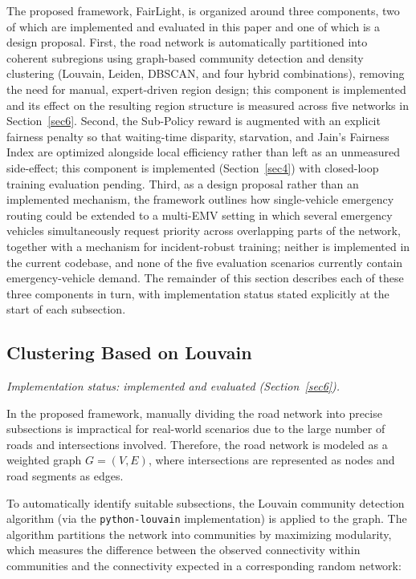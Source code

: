 \documentclass[3p,times]{elsarticle}
\theoremstyle{plain}
\theoremstyle{definition}
\begin{document}
The proposed framework, FairLight, is organized around three
components, two of which are implemented and evaluated in this paper
and one of which is a design proposal. First, the road network is
automatically partitioned into coherent subregions using graph-based
community detection and density clustering (Louvain, Leiden, DBSCAN,
and four hybrid combinations), removing the need for manual,
expert-driven region design; this component is implemented and its
effect on the resulting region structure is measured across five
networks in Section~\ref{sec6}. Second, the Sub-Policy reward is
augmented with an explicit fairness penalty so that waiting-time
disparity, starvation, and Jain's Fairness Index are optimized
alongside local efficiency rather than left as an unmeasured
side-effect; this component is implemented (Section~\ref{sec4}) with
closed-loop training evaluation pending. Third, as a design proposal
rather than an implemented mechanism, the framework outlines how
single-vehicle emergency routing could be extended to a multi-EMV
setting in which several emergency vehicles simultaneously request
priority across overlapping parts of the network, together with a
mechanism for incident-robust training; neither is implemented in the
current codebase, and none of the five evaluation scenarios currently
contain emergency-vehicle demand. The remainder of this section
describes each of these three components in turn, with implementation
status stated explicitly at the start of each subsection.


\subsection{Clustering Based on Louvain}\label{subsec3-1}

\textit{Implementation status: implemented and evaluated
(Section~\ref{sec6}).}

In the proposed framework, manually dividing the road network into
precise subsections is impractical for real-world scenarios due to
the large number of roads and intersections involved. Therefore, the
road network is modeled as a weighted graph $G = (V, E)$, where
intersections are represented as nodes and road segments as edges.

To automatically identify suitable subsections, the Louvain
community detection algorithm (via the \texttt{python-louvain}
implementation) is applied to the graph. The algorithm
partitions the network into communities by maximizing
modularity, which measures the difference between the
observed connectivity within communities and the connectivity
expected in a corresponding random network:
\end{document}

